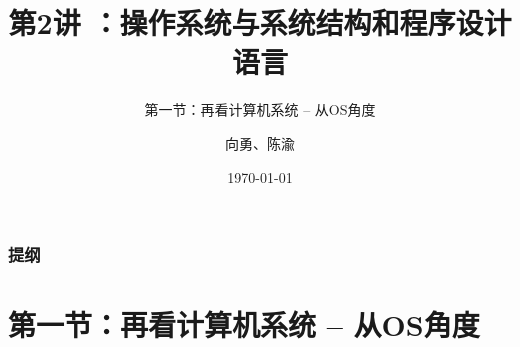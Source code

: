 


\title[第2讲]{第2讲 ：操作系统与系统结构和程序设计语言} %
\subtitle{第一节：再看计算机系统 -- 从OS角度}
\author{向勇、陈渝} %
\date{\today} %



\begin{frame}
\titlepage %
\end{frame}

\begin{frame}
\frametitle{提纲} %
\tableofcontents %
\end{frame}


\section{第一节：再看计算机系统 -- 从OS角度 } %

